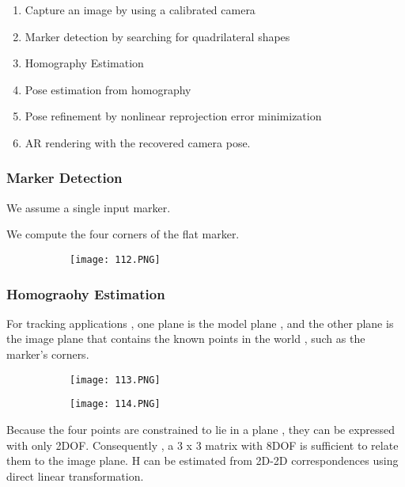 \documentclass{article}
\begin{document}
\begin{enumerate}
    \item Capture an image by using a calibrated camera
    \item Marker detection by searching for quadrilateral shapes
    \item Homography Estimation
    \item Pose estimation from homography
    \item Pose refinement by nonlinear reprojection error minimization
    \item AR rendering with the recovered camera pose.
\end{enumerate}

\subsubsection{ Marker Detection}

We assume a single input marker.

We compute the four corners of the flat marker.

\begin{figure}[ht!]
  \centering
  \begin{subfigure}[b]{0.4\linewidth}
    \texttt{[image: 112.PNG]}
  \end{subfigure}
\end{figure}

\subsubsection{ Homograohy Estimation}

For tracking applications , one plane is the model plane , and the other plane is the image plane that contains the known points in the world , such as the marker's corners.

\begin{figure}[ht!]
  \centering
  \begin{subfigure}[b]{0.4\linewidth}
    \texttt{[image: 113.PNG]}
  \end{subfigure}
  \begin{subfigure}[b]{0.4\textwidth}
         \centering
         \texttt{[image: 114.PNG]}
     \end{subfigure}
\end{figure}

Because the four points are constrained to lie in a plane , they can be expressed with only 2DOF.
Consequently , a 3 x 3 matrix with 8DOF is sufficient to relate them to the image plane.
H can be estimated from 2D-2D correspondences using direct linear transformation.
\end{document}
